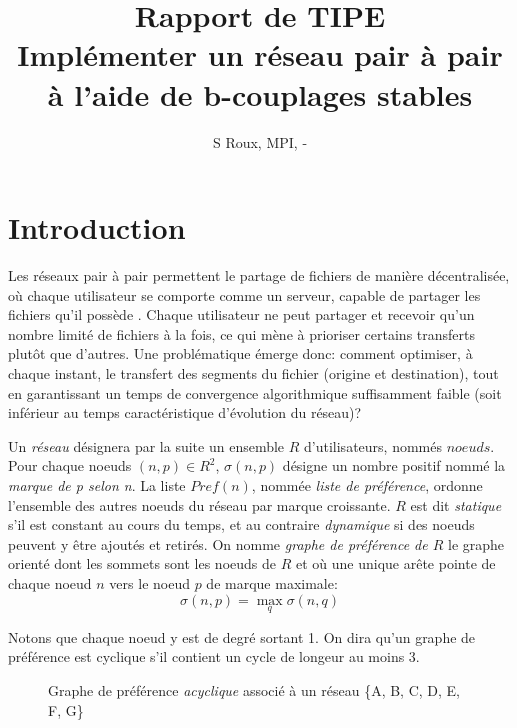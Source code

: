 \documentclass[12pt,a4paper]{article}
\title{Rapport de TIPE\\
Implémenter un réseau pair à pair à l'aide de b-couplages stables}
\author{S Roux, MPI, \oldstylenums{2025}-\oldstylenums{2026}}
\begin{document}
\maketitle

\tableofcontents

\section{Introduction}


Les réseaux pair à pair permettent le partage de fichiers de manière décentralisée, où chaque utilisateur se comporte comme un serveur, capable de partager les fichiers qu'il possède \cite{cohen}. 
Chaque utilisateur ne peut partager et recevoir qu'un nombre limité de fichiers à la fois, ce qui mène à prioriser certains transferts plutôt que d'autres. 
Une problématique émerge donc: comment optimiser, à chaque instant, le transfert des segments du fichier (origine et destination), tout en garantissant un temps de convergence algorithmique suffisamment faible (soit inférieur au temps caractéristique d’évolution du réseau)? 


Un \textit{réseau} désignera par la suite un ensemble $R$ d'utilisateurs, nommés $noeuds$. Pour chaque noeuds $(n, p)\in R^2$, $\sigma(n, p)$ désigne un nombre positif nommé la \textit{marque de p selon n}. La liste $Pref(n)$, nommée \textit{liste de préférence}, ordonne l'ensemble des autres noeuds du réseau par marque croissante. $R$ est dit \textit{statique} s'il est constant au cours du temps, et au contraire \textit{dynamique} si des noeuds peuvent y être ajoutés et retirés.
On nomme \textit{graphe de préférence de $R$} le graphe orienté dont les sommets sont les noeuds de $R$ et où une unique arête pointe de chaque noeud $n$ vers le noeud $p$ de marque maximale: 
\begin{equation}
\sigma(n, p)=\max\limits_{q} \sigma(n, q)
\end{equation}

Notons que chaque noeud y est de degré sortant 1. On dira qu'un graphe de préférence est cyclique s'il contient un cycle de longeur au moins 3.

\vspace{0.2cm}
\begin{figure}[H]
  \centering
  \caption{Graphe de préférence \textit{acyclique} associé à un réseau \{A, B, C, D, E, F, G\}}
\end{figure}
\end{document}
